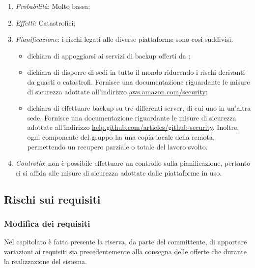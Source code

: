 \begin{enumerate}
\item \textit{Probabilità}: Molto bassa;
\item \textit{Effetti}: Catastrofici;
\item \textit{Pianificazione}: i rischi legati alle diverse piattaforme sono così suddivisi.

	\begin{itemize}
	\item {} dichiara di appoggiarsi ai servizi di backup offerti da ;
	\item {} dichiara di disporre di sedi in tutto il mondo riducendo i rischi derivanti da guasti o catastrofi. Fornisce una documentazione riguardante le misure di sicurezza adottate all'indirizzo \url{aws.amazon.com/security};
	\item {} dichiara di effettuare backup su tre differenti server,  di cui uno in un'altra sede. Fornisce una documentazione riguardante le misure di sicurezza adottate all'indirizzo \url{help.github.com/articles/github-security}. Inoltre, ogni componente del gruppo ha una copia locale della  remota, permettendo un recupero parziale o totale del lavoro svolto. 
	\end{itemize}
	
\item \textit{Controllo}: non è possibile effettuare un controllo sulla pianificazione, pertanto ci si affida alle misure di sicurezza adottate dalle piattaforme in uso.
\end{enumerate}
	
	\subsection{Rischi sui requisiti}
	
		\subsubsection{Modifica dei requisiti}
		
Nel capitolato è fatta presente la riserva, da parte del committente, di apportare variazioni ai requisiti sia precedentemente alla consegna delle offerte che durante la realizzazione del sistema.


